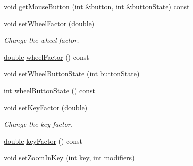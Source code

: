 \begin{DoxyCompactItemize}
\item 
\hyperlink{group___u_a_v_objects_plugin_ga444cf2ff3f0ecbe028adce838d373f5c}{void} \hyperlink{class_qwt_magnifier_a3bf315d2740542648b2aed56ade85705}{get\-Mouse\-Button} (\hyperlink{ioapi_8h_a787fa3cf048117ba7123753c1e74fcd6}{int} \&button, \hyperlink{ioapi_8h_a787fa3cf048117ba7123753c1e74fcd6}{int} \&button\-State) const 
\item 
\hyperlink{group___u_a_v_objects_plugin_ga444cf2ff3f0ecbe028adce838d373f5c}{void} \hyperlink{class_qwt_magnifier_ae3a33ab8776ed2122fecc821a32bb36a}{set\-Wheel\-Factor} (\hyperlink{_super_l_u_support_8h_a8956b2b9f49bf918deed98379d159ca7}{double})
\begin{DoxyCompactList}\small\item\em Change the wheel factor. \end{DoxyCompactList}\item 
\hyperlink{_super_l_u_support_8h_a8956b2b9f49bf918deed98379d159ca7}{double} \hyperlink{class_qwt_magnifier_a83722e9f081603a45e118947d7f810a4}{wheel\-Factor} () const 
\item 
\hyperlink{group___u_a_v_objects_plugin_ga444cf2ff3f0ecbe028adce838d373f5c}{void} \hyperlink{class_qwt_magnifier_a36270c611c465f11f3ade46f3b3bb74a}{set\-Wheel\-Button\-State} (\hyperlink{ioapi_8h_a787fa3cf048117ba7123753c1e74fcd6}{int} button\-State)
\item 
\hyperlink{ioapi_8h_a787fa3cf048117ba7123753c1e74fcd6}{int} \hyperlink{class_qwt_magnifier_a76521288b081b76d1edebfc8bc16e884}{wheel\-Button\-State} () const 
\item 
\hyperlink{group___u_a_v_objects_plugin_ga444cf2ff3f0ecbe028adce838d373f5c}{void} \hyperlink{class_qwt_magnifier_ac079b44e124fdaba1d894ef519bc4e4f}{set\-Key\-Factor} (\hyperlink{_super_l_u_support_8h_a8956b2b9f49bf918deed98379d159ca7}{double})
\begin{DoxyCompactList}\small\item\em Change the key factor. \end{DoxyCompactList}\item 
\hyperlink{_super_l_u_support_8h_a8956b2b9f49bf918deed98379d159ca7}{double} \hyperlink{class_qwt_magnifier_a98706c848275b06d2830a8dbe053c9a3}{key\-Factor} () const 
\item 
\hyperlink{group___u_a_v_objects_plugin_ga444cf2ff3f0ecbe028adce838d373f5c}{void} \hyperlink{class_qwt_magnifier_a51691b6a49437467d140fc0687b68140}{set\-Zoom\-In\-Key} (\hyperlink{ioapi_8h_a787fa3cf048117ba7123753c1e74fcd6}{int} key, \hyperlink{ioapi_8h_a787fa3cf048117ba7123753c1e74fcd6}{int} modifiers)

\end{DoxyCompactItemize}
